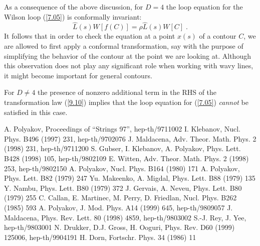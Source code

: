 \documentclass[a4paper,12pt]{article}
\numberwithin{equation}{section}
\begin{document}
As a consequence of the above discussion, for \( D=4 \) the loop equation for
the Wilson loop (\ref{7.05}) is conformally invariant:
\begin{equation}
\label{9.1}
\widehat{L}(s)W[f(C)]=\rho \widehat{L}(s)W[C]\; .
\end{equation}
 It follows that in order to check the equation at a point \( x(s) \) of a
contour \( C \), we are allowed to first apply a conformal transformation,
say with the purpose of simplifying the behavior of the contour at the point
we are looking at. Although this observation does not play any significant role
when working with wavy lines, it might become important for general contours. 

For \( D\ne 4 \) the presence of nonzero additional term in the RHS of the
transformation law (\ref{9.10}) implies that the loop equation for (\ref{7.05})
\emph{cannot} be satisfied in this case.

\begin{thebibliography}{10}
A. Polyakov, Proceedings of ``Strings 97'', hep-th/9711002
I. Klebanov, Nucl. Phys. B496 (1997) 231, hep-th/9702076
J. Maldacena, Adv. Theor. Math. Phys. 2 (1998) 231, hep-th/9711200
S. Gubser, I. Klebanov, A. Polyakov, Phys. Lett. B428 (1998) 105, hep-th/9802109
E. Witten, Adv. Theor. Math. Phys. 2 (1998) 253, hep-th/9802150
A. Polyakov, Nucl. Phys. B164 (1980) 171
A. Polyakov, Phys. Lett. B82 (1979) 247
Yu. Makeenko, A. Migdal, Phys. Lett. B88 (1979) 135
Y. Nambu, Phys. Lett. B80 (1979) 372
J. Gervais, A. Neveu, Phys. Lett. B80 (1979) 255
C. Callan, E. Martinec, M. Perry, D. Friedlan, Nucl. Phys. B262 (1985) 593
A. Polyakov, J. Mod. Phys. A14 (1999) 645, hep-th/9809057
J. Maldacena, Phys. Rev. Lett. 80 (1998) 4859, hep-th/9803002
S.-J. Rey, J. Yee, hep-th/9803001
N. Drukker, D.J. Gross, H. Ooguri, Phys. Rev. D60 (1999) 125006, hep-th/9904191
H. Dorn, Fortschr. Phys. 34 (1986) 11
\end{thebibliography}
\end{document}
